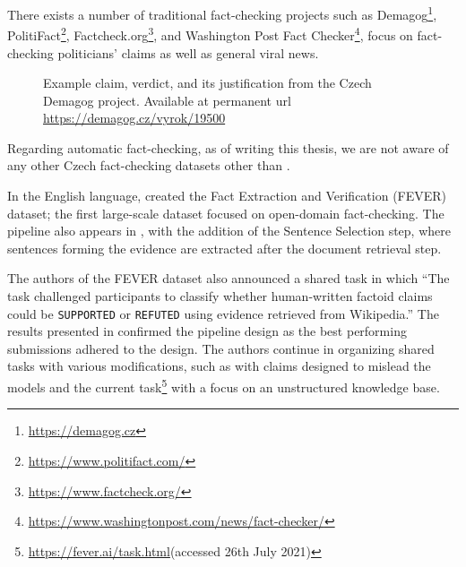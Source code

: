 There exists a number of traditional fact-checking projects such as Demagog\footnote{\url{https://demagog.cz}}, PolitiFact\footnote{\url{https://www.politifact.com/}}, Factcheck.org\footnote{\url{https://www.factcheck.org/}}, and Washington Post Fact Checker\footnote{\url{https://www.washingtonpost.com/news/fact-checker/}}, focus on fact-checking politicians' claims as well as general viral news. 

\begin{figure}[h!]
    \caption{Example claim, verdict, and its justification from the Czech Demagog project. Available at permanent url \url{https://demagog.cz/vyrok/19500}}
\end{figure}

Regarding automatic fact-checking, as of writing this thesis, we are not aware of any other Czech fact-checking datasets other than \citep{czech-fact}.

In the English language, \citet{fever} created the Fact Extraction and Verification (FEVER) dataset; the first large-scale dataset focused on open-domain fact-checking.
The pipeline also appears in \citep{fever}, with the addition of the Sentence Selection step, where sentences forming the evidence are extracted after the document retrieval step.

The authors of the FEVER dataset also announced a shared task \citep{fever-2018-shared-task} in which ``The task challenged participants to classify whether human-written factoid claims could be \texttt{SUPPORTED} or \texttt{REFUTED} using evidence retrieved from Wikipedia.'' The results presented in \citep{fever-2018-shared-task} confirmed the pipeline design as the best performing submissions adhered to the design. The authors continue in organizing shared tasks with various modifications, such as \citep{fever-2019-shared-task-adversial} with claims designed to mislead the models and the current task\footnote{\url{https://fever.ai/task.html}(accessed 26th July 2021)} with a focus on an unstructured knowledge base.



